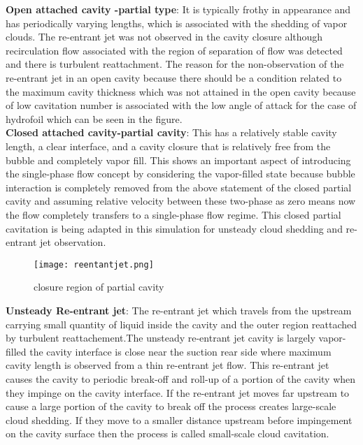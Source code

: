 \textbf{Open attached cavity -partial type}: It is typically frothy in
appearance and has periodically varying lengths, which is associated
with the shedding of vapor clouds. The re-entrant jet was not observed
in the cavity closure although recirculation flow associated with the
region of separation of flow was detected and there is turbulent
reattachment. The reason for the non-observation of the re-entrant jet
in an open cavity because there should be a condition related to the
maximum cavity thickness which was not attained in the open cavity
because of low cavitation number is associated with the low angle of
attack for the case of hydrofoil which can be seen in the
figure.\\ \textbf{Closed attached cavity-partial cavity}: This has a
relatively stable cavity length, a clear interface, and a cavity
closure that is relatively free from the bubble and completely vapor
fill. This shows an important aspect of introducing the single-phase
flow concept by considering the vapor-filled state because bubble
interaction is completely removed from the above statement of the
closed partial cavity and assuming relative velocity between these
two-phase as zero means now the flow completely transfers to a
single-phase flow regime. This closed partial cavitation is being
adapted in this simulation for unsteady cloud shedding and re-entrant
jet observation.\\

\begin{figure}[H]
  \centering
  \texttt{[image: reentantjet.png]}
  \caption{closure region of partial cavity}
  \label{fig:fig11}
\end{figure}

\textbf{Unsteady Re-entrant jet}: The re-entrant jet which travels
from the upstream carrying small quantity of liquid inside the cavity
and the outer region reattached by turbulent reattachement.The
unsteady re-entrant jet cavity is largely vapor-filled the cavity
interface is close near the suction rear side where maximum cavity
length is observed from a thin re-entrant jet flow. This re-entrant
jet causes the cavity to periodic break-off and roll-up of a portion
of the cavity when they impinge on the cavity interface. If the
re-entrant jet moves far upstream to cause a large portion of the
cavity to break off the process creates large-scale cloud shedding. If
they move to a smaller distance upstream before impingement on the
cavity surface then the process is called small-scale cloud
cavitation.

